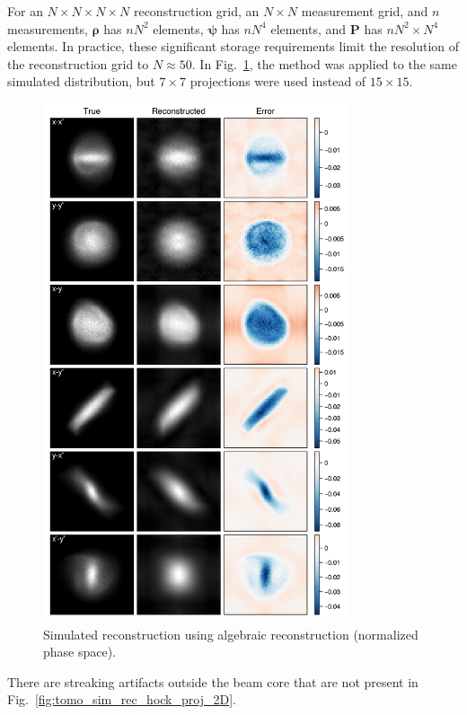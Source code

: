 For an $N \times N \times N \times N$ reconstruction grid, an $N \times N$ measurement grid, and $n$ measurements, $\bm{\rho}$ has $nN^2$ elements, $\bm{\psi}$ has $n N^4$ elements, and $\mathbf{P}$ has $n N^2 \times N^4$ elements. In practice, these significant storage requirements limit the resolution of the reconstruction grid to $N \approx 50$. In Fig.~\ref{fig:tomo_sim_rec_art_proj_2D}, the method was applied to the same simulated distribution, but $7 \times 7$ projections were used instead of $15 \times 15$.
%
\begin{figure}[!p]
    \centering
    \includegraphics[width=0.8\textwidth]{Images/chapter4/tomo_sim_rec_art_proj2D.png}
    \caption{Simulated reconstruction using algebraic reconstruction (normalized phase space).}
    \label{fig:tomo_sim_rec_art_proj_2D}
\end{figure}
%
There are streaking artifacts outside the beam core that are not present in Fig.~\ref{fig:tomo_sim_rec_hock_proj_2D}. 


